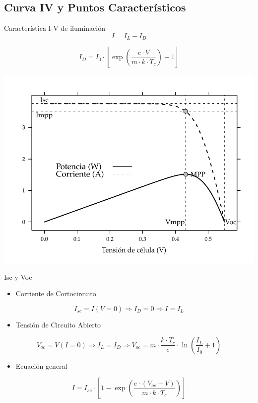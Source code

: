 \documentclass[xcolor={usenames,svgnames,dvipsnames}]{beamer}
\begin{document}
\subsection{Curva IV y Puntos Característicos}
\label{sec-3-1}
\begin{frame}[label=sec-3-1-1]{Característica I-V de iluminación}
$$I=I_{L}-I_{D}$$

$$I_{D}=I_{0}\cdot\left[\exp\left(\frac{e\cdot V}{m\cdot k\cdot
      T_{c}}\right)-1\right]$$

\includegraphics[width=.9\linewidth]{../figs/CurvaIV_Ta20_G800.pdf}
\end{frame}

\begin{frame}[label=sec-3-1-2]{Isc y Voc}
\begin{itemize}
\item Corriente de Cortocircuito
\end{itemize}

$$I_{sc}=I(V=0)\Rightarrow I_{D}=0\Rightarrow I=I_{L}$$

\begin{itemize}
\item Tensión de Circuito Abierto
\end{itemize}

$$V_{oc}=V(I=0)\Rightarrow I_{L}=I_{D}\Rightarrow
V_{oc}=m\cdot\frac{k\cdot
  T_{c}}{e}\cdot\ln\left(\frac{I_{L}}{I_{0}}+1\right)$$

\begin{itemize}
\item Ecuación general
\end{itemize}

$$I=I_{sc}\cdot\left[1-\exp\left(\frac{e\cdot(V_{oc}-V)}{m\cdot k\cdot
      T_{c}}\right)\right]$$
\end{frame}
\end{document}
